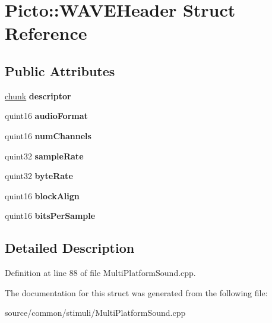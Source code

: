 \hypertarget{struct_picto_1_1_w_a_v_e_header}{\section{Picto\-:\-:W\-A\-V\-E\-Header Struct Reference}
\label{struct_picto_1_1_w_a_v_e_header}
}
\subsection*{Public Attributes}
\begin{DoxyCompactItemize}
\item 
\hypertarget{struct_picto_1_1_w_a_v_e_header_a39685d553e353574512ccc97425cda53}{\hyperlink{struct_picto_1_1chunk}{chunk} {\bfseries descriptor}}\label{struct_picto_1_1_w_a_v_e_header_a39685d553e353574512ccc97425cda53}

\item 
\hypertarget{struct_picto_1_1_w_a_v_e_header_a74507f44bbdf36d2037018652399c0e9}{quint16 {\bfseries audio\-Format}}\label{struct_picto_1_1_w_a_v_e_header_a74507f44bbdf36d2037018652399c0e9}

\item 
\hypertarget{struct_picto_1_1_w_a_v_e_header_a690d7b9897fea33e23b1531c053d95e1}{quint16 {\bfseries num\-Channels}}\label{struct_picto_1_1_w_a_v_e_header_a690d7b9897fea33e23b1531c053d95e1}

\item 
\hypertarget{struct_picto_1_1_w_a_v_e_header_adb2ea8d05be4573b2afaf3d9c38355ef}{quint32 {\bfseries sample\-Rate}}\label{struct_picto_1_1_w_a_v_e_header_adb2ea8d05be4573b2afaf3d9c38355ef}

\item 
\hypertarget{struct_picto_1_1_w_a_v_e_header_a7b5843ed6634c761d8d2e1eaff115197}{quint32 {\bfseries byte\-Rate}}\label{struct_picto_1_1_w_a_v_e_header_a7b5843ed6634c761d8d2e1eaff115197}

\item 
\hypertarget{struct_picto_1_1_w_a_v_e_header_a8f083c4d58388d502394a9092c5e2239}{quint16 {\bfseries block\-Align}}\label{struct_picto_1_1_w_a_v_e_header_a8f083c4d58388d502394a9092c5e2239}

\item 
\hypertarget{struct_picto_1_1_w_a_v_e_header_a8027a6f2a265a5e28d042890674e8371}{quint16 {\bfseries bits\-Per\-Sample}}\label{struct_picto_1_1_w_a_v_e_header_a8027a6f2a265a5e28d042890674e8371}

\end{DoxyCompactItemize}


\subsection{Detailed Description}


Definition at line 88 of file Multi\-Platform\-Sound.\-cpp.



The documentation for this struct was generated from the following file\-:\begin{DoxyCompactItemize}
\item 
source/common/stimuli/Multi\-Platform\-Sound.\-cpp\end{DoxyCompactItemize}
